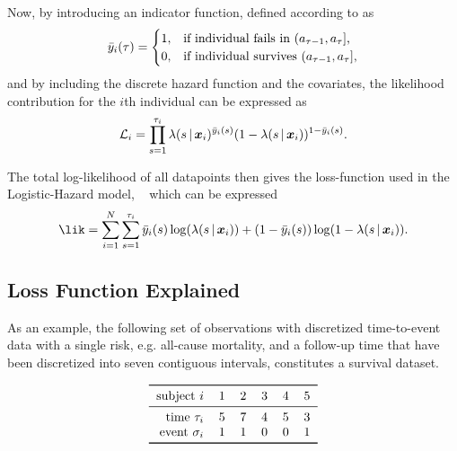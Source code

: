 Now, by introducing an indicator function, 
defined according to \textcite{tutzModeling2016} as 
\begin{equation}
    \label{eq:lh-indicator}
    \bar{y}_i(\tid) = \begin{cases}
        1, & \text{if individual fails in \((a_{\tid-1}, a_{\tid}]\),} \\
        0, & \text{if individual survives \((a_{\tid-1}, a_{\tid}]\),}
    \end{cases}
\end{equation}
and by including the discrete hazard function and the covariates, 
the likelihood contribution for the \(i\)th individual can be expressed as
\begin{equation}
    \label{eq:lh-likelihood}
    \Lik_i = \prod_{s=1}^{\tid_i} 
        \lambda(s \giv \vec{x}_i)^{\bar{y}_i(s)}
        (1 - \lambda(s \giv \vec{x}_i))^{1 - \bar{y}_i(s)}.
\end{equation}

The total log-likelihood of all datapoints then gives the loss-function
used in the Logistic-Hazard model, 
~\autocite{gensheimerScalable2019, tutzModeling2016}
which can be expressed
\begin{equation}
    \label{eq:lh-loglikelihood}
    \lik = 
        \sum_{i = 1}^{N} 
            \sum_{s=1}^{\tid_i} 
                \bar{y}_i(s) \log (\lambda(s\giv\vec{x}_i))
                + (1 - \bar{y}_i(s)) \log (1 - \lambda(s\giv\vec{x}_i)).
\end{equation}

\subsection{Loss Function Explained}

\def\y#1#2{\hat{\lambda}_{#1#2}}
\def\yy#1#2{1\!-\!\y{#1}{#2}}

As an example, the following set of observations with discretized 
time-to-event data with a single risk, e.g. all-cause mortality, 
and a follow-up time that have been discretized into seven contiguous intervals,
constitutes a survival dataset.

\begin{equation}
\begin{tabular}{r  ccccc}
    \toprule
    subject   \(i\)      & 1 & 2 & 3 & 4 & 5 \\
    \midrule
    time    \(\tau_i\)   & 5 & 7 & 4 & 5 & 3 \\
    event   \(\sigma_i\) & 1 & 1 & 0 & 0 & 1 \\
    \bottomrule
\end{tabular}
\end{equation}

